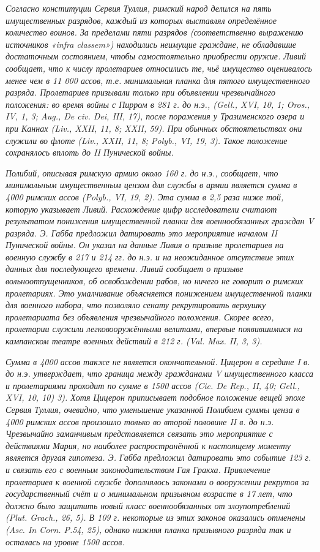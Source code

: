 \textit{Согласно конституции Сервия Туллия, римский народ делился на пять имущественных разрядов, каждый из которых выставлял определённое количество воинов. За пределами пяти разрядов (соответственно выражению источников «infra classem») находились неимущие граждане, не обладавшие достаточным состоянием, чтобы самостоятельно приобрести оружие. Ливий сообщает, что к числу пролетариев относились те, чьё имущество оценивалось менее чем в 11 000 ассов, т.е. минимальная планка для пятого имущественного разряда. Пролетариев призывали только при объявлении чрезвычайного положения: во время войны с Пирром в 281 г. до н.э., (Gell., XVI, 10, 1; Oros., IV, 1, 3; Aug., De civ. Dei, III, 17), после поражения у Тразименского озера и при Каннах (Liv., XXII, 11, 8; XXII, 59). При обычных обстоятельствах они служили во флоте (Liv., XXII, 11, 8; Polyb., VI, 19, 3). Такое положение сохранялось вплоть до II Пунической войны.}


\textit{Полибий, описывая римскую армию около 160 г. до н.э., сообщает, что минимальным имущественным цензом для службы в армии является сумма в 4000 римских ассов (Polyb., VI, 19, 2). Эта сумма в 2,5 раза ниже той, которую указывает Ливий. Расхождение цифр исследователи считают результатом понижения имущественной планки для военнообязанных граждан V разряда. Э. Габба предложил датировать это мероприятие началом II Пунической войны. Он указал на данные Ливия о призыве пролетариев на военную службу в 217 и 214 гг. до н.э. и на неожиданное отсутствие этих данных для последующего времени. Ливий сообщает о призыве вольноотпущенников, об освобождении рабов, но ничего не говорит о римских пролетариях. Это умалчивание объясняется понижением имущественной планки для военного набора, что позволяло сенату рекрутировать верхушку пролетариата без объявления чрезвычайного положения. Скорее всего, пролетарии служили легковооружёнными велитами, впервые появившимися на кампанском театре военных действий в 212 г. (Val. Max. II, 3, 3).}


\textit{Сумма в 4000 ассов также не является окончательной. Цицерон в середине I в. до н.э. утверждает, что граница между гражданами V имущественного класса и пролетариями проходит по сумме в 1500 ассов (Cic. De Rep., II, 40; Gell., XVI, 10, 10) 3). Хотя Цицерон приписывает подобное положение вещей эпохе Сервия Туллия, очевидно, что уменьшение указанной Полибием суммы ценза в 4000 римских ассов произошло только во второй половине II в. до н.э. Чрезвычайно заманчивым представляется связать это мероприятие с действиями Мария, но наиболее распространённой к настоящему моменту является другая гипотеза. Э. Габба предложил датировать это событие 123 г. и связать его с военным законодательством Гая Гракха. Привлечение пролетариев к военной службе дополнялось законами о вооружении рекрутов за государственный счёт и о минимальном призывном возрасте в 17 лет, что должно было защитить новый класс военнообязанных от злоупотреблений (Plut. Grach., 26, 5). В 109 г. некоторые из этих законов оказались отменены (Asc. In Corn. P.54, 25), однако нижняя планка призывного разряда так и осталась на уровне 1500 ассов.}


